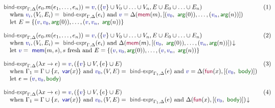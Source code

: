 \documentclass[acmsmall,anonymous,fleqn]{acmart}\settopmatter{printfolios=false,printccs=false,printacmref=false}
\theoremstyle{plain}
\theoremstyle{definition}
\newcommand{\ident}[1]{\textnormal{\textcolor{idclr}{\sffamily #1}}}
\newcommand{\bndclr}[1]{\textcolor{kvdclr}{#1}}
\newcommand{\bnd}[1]{\textnormal{\textcolor{kvdclr}{\sffamily #1}}}
\newcommand{\bknd}[1]{\textnormal{\textcolor{prepclr}{\sffamily #1}}}
\newcommand{\blbl}[1]{\textnormal{\textcolor{numclr}{\sffamily #1}}}
\begin{document}

\begin{figure}[t]
\begin{equation*}
\hspace{-3.5em}
\begin{array}{ll}
\ident{bind-expr}_{\Gamma, \Delta}(e_0.m(e_1, \ldots, e_n)) = \bndclr{v}, (\{\bndclr{v}\} \cup V_0 \cup \ldots \cup V_n, E \cup E_0 \cup \ldots \cup E_n) &(1)~~\\
\quad \textnormal{when}~\bndclr{v_i}, (V_i, E_i) = \ident{bind-expr}_{\Gamma, \Delta}(e_i)
~\textnormal{and}~\bndclr{v} = \Delta(\bknd{mem}(m),[(\bndclr{v_0}, \blbl{arg}(0)), \ldots, (\bndclr{v_n}, \blbl{arg}(n))])\\
\quad \textnormal{let}~E = \{ (\bndclr{v}, \bndclr{v_0}, \blbl{arg}(0)), \ldots, (\bndclr{v}, \bndclr{v_n}, \blbl{arg}(n))\}
\\[1em]
\ident{bind-expr}_{\Gamma, \Delta}(e_0.m(e_1, \ldots, e_n)) = \bndclr{v}, (\{\bndclr{v}\} \cup V_0 \cup \ldots \cup V_n, E \cup E_0 \cup \ldots \cup E_n)&(2)\\
\quad \textnormal{when}~\bndclr{v_i}, (V_i, E_i) = \ident{bind-expr}_{\Gamma, \Delta}(e_i)
~\textnormal{and}~\Delta(\bknd{mem}(m),[(\bndclr{v_0}, \blbl{arg}(0)), \ldots, (\bndclr{v_n}, \blbl{arg}(n))])\!\downarrow\\
\quad \textnormal{let}~\bndclr{v} = \bnd{mem}(m, s), s~\textnormal{fresh}
~\textnormal{and}~E = \{ (\bndclr{v}, \bndclr{v_0}, \blbl{arg}(0)), \ldots, (\bndclr{v},\bndclr{v_n}, \blbl{arg}(n)) \}
\\[1em]
\ident{bind-expr}_{\Gamma, \Delta}(\lambda x \rightarrow e) = \bndclr{v}, (\{\bndclr{v}\} \cup V, \{e\} \cup E)&(3)\\
\quad \textnormal{when}~\Gamma_1 = \Gamma \cup \{ x, \bnd{var}(x) \}
~\textnormal{and}~\bndclr{v_0}, (V, E) = \ident{bind-expr}_{\Gamma_1, \Delta}(e)
~\textnormal{and}~\bndclr{v} = \Delta(\bknd{fun}(x),[(\bndclr{v_0}, \blbl{body})])\\
\quad \textnormal{let}~e = (\bndclr{v}, \bndclr{v_0}, \blbl{body})
\\[1em]
\ident{bind-expr}_{\Gamma, \Delta}(\lambda x \rightarrow e) = \bndclr{v}, (\{\bndclr{v}\} \cup V, \{e\} \cup E)&(4)\\
\quad \textnormal{when}~\Gamma_1 = \Gamma \cup \{ x, \bnd{var}(x) \}
~\textnormal{and}~\bndclr{v_0}, (V, E) = \ident{bind-expr}_{\Gamma_1, \Delta}(e)
~\textnormal{and}~\Delta(\bknd{fun}(x),[(\bndclr{v_0}, \blbl{body})])\!\downarrow\\

\end{array}
\end{equation*}
\end{figure}
\end{document}
